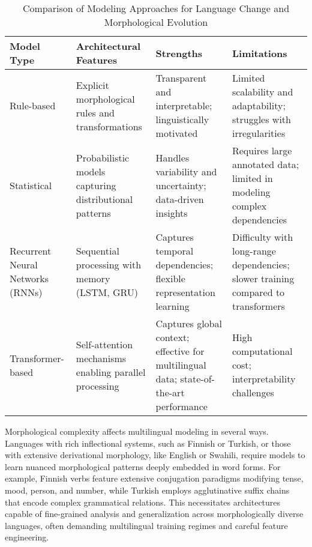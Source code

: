 \documentclass[sigconf]{acmart}
\begin{document}
\begin{table*}[htbp]
\centering
\caption{Comparison of Modeling Approaches for Language Change and Morphological Evolution}
\label{tab:model-comparison}
\begin{adjustbox}{max width=\textwidth}
\begin{tabular}{@{}llll@{}}
\toprule
Model Type & Architectural Features & Strengths & Limitations \\ \midrule
Rule-based & Explicit morphological rules and transformations & Transparent and interpretable; linguistically motivated & Limited scalability and adaptability; struggles with irregularities \\
Statistical & Probabilistic models capturing distributional patterns & Handles variability and uncertainty; data-driven insights & Requires large annotated data; limited in modeling complex dependencies \\
Recurrent Neural Networks (RNNs) & Sequential processing with memory (LSTM, GRU) & Captures temporal dependencies; flexible representation learning & Difficulty with long-range dependencies; slower training compared to transformers \\
Transformer-based & Self-attention mechanisms enabling parallel processing & Captures global context; effective for multilingual data; state-of-the-art performance & High computational cost; interpretability challenges \\ \bottomrule
\end{tabular}
\end{adjustbox}
\end{table*}

Morphological complexity affects multilingual modeling in several ways. Languages with rich inflectional systems, such as Finnish or Turkish, or those with extensive derivational morphology, like English or Swahili, require models to learn nuanced morphological patterns deeply embedded in word forms. For example, Finnish verbs feature extensive conjugation paradigms modifying tense, mood, person, and number, while Turkish employs agglutinative suffix chains that encode complex grammatical relations. This necessitates architectures capable of fine-grained analysis and generalization across morphologically diverse languages, often demanding multilingual training regimes and careful feature engineering.
\end{document}
